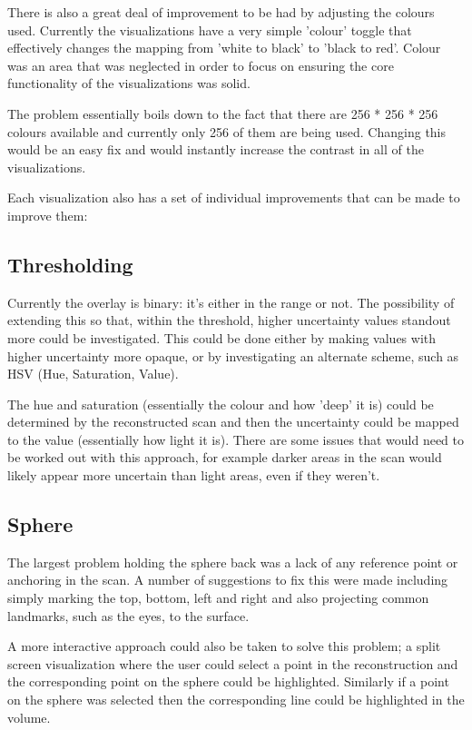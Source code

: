 There is also a great deal of improvement to be had by adjusting the colours used. Currently the visualizations have a very simple 'colour' toggle that effectively changes the mapping from 'white to black' to 'black to red'. Colour was an area that was neglected in order to focus on ensuring the core functionality of the visualizations was solid.

The problem essentially boils down to the fact that there are 256 * 256 * 256 colours available and currently only 256 of them are being used. Changing this would be an easy fix and would instantly increase the contrast in all of the visualizations.

Each visualization also has a set of individual improvements that can be made to improve them:

\subsection*{Thresholding}
Currently the overlay is binary: it's either in the range or not. The possibility of extending this so that, within the threshold, higher uncertainty values standout more could be investigated. This could be done either by making values with higher uncertainty more opaque, or by investigating an alternate scheme, such as HSV (Hue, Saturation, Value). 

The hue and saturation (essentially the colour and how 'deep' it is) could be determined by the reconstructed scan and then the uncertainty could be mapped to the value (essentially how light it is). There are some issues that would need to be worked out with this approach, for example darker areas in the scan would likely appear more uncertain than light areas, even if they weren't.

\subsection*{Sphere}
The largest problem holding the sphere back was a lack of any reference point or anchoring in the scan. A number of suggestions to fix this were made including simply marking the top, bottom, left and right and also projecting common landmarks, such as the eyes, to the surface.

A more interactive approach could also be taken to solve this problem; a split screen visualization where the user could select a point in the reconstruction and the corresponding point on the sphere could be highlighted. Similarly if a point on the sphere was selected then the corresponding line could be highlighted in the volume.

